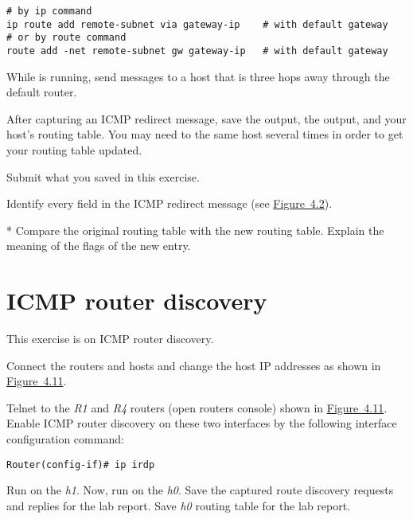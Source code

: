 \documentclass{../UTNetLab}
\begin{document}
\begin{lstlisting}[emph={eth0,gateway-ip,remote-subnet},morekeywords={[3]add,dev,via,gw}]
# by ip command
ip route add remote-subnet via gateway-ip    # with default gateway
# or by route command
route add -net remote-subnet gw gateway-ip   # with default gateway
    \end{lstlisting}

While  is running, send  messages to a host that is three hops away through the default router.

After capturing an ICMP redirect message, save the  output, the  output, and your host’s routing table.
You may need to  the same host several times in order to get your routing table updated.

\begin{report}
    \item Submit what you saved in this exercise.

    \item Identify every field in the ICMP redirect message (see \hyperref[fig:4.2]{Figure~4.2}).

    \item [*] Compare the original routing table with the new routing table.
    Explain the meaning of the flags of the new entry.
\end{report}

\section{ICMP router discovery}\label{sec:ICMPRD}
This exercise is on ICMP router discovery.

Connect the routers and hosts and change the host IP addresses as shown in \hyperref[fig:4.11]{Figure~4.11}.

Telnet to the \textit{R1} and \textit{R4} routers (open routers console) shown in \hyperref[fig:4.11]{Figure~4.11}.
Enable ICMP router discovery on these two interfaces by the following interface configuration command:
\begin{lstlisting}[language={cisco}]
Router(config-if)# ip irdp
    \end{lstlisting}
Run  on the \textit{h1}.
Now, run  on the \textit{h0}.
Save the captured route discovery requests and replies for the lab report.
Save \textit{h0} routing table for the lab report.
\end{document}
